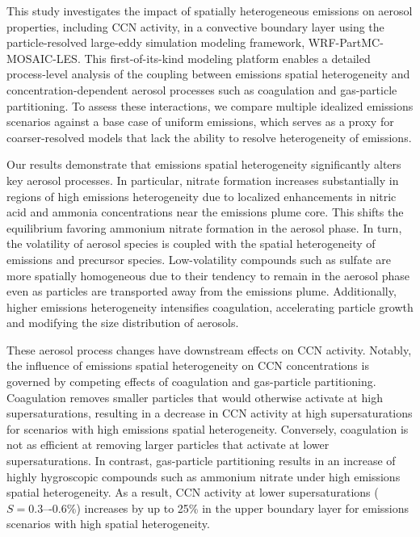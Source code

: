 \documentclass[journal abbreviation, manuscript]{copernicus}
\begin{document}
This study investigates the impact of spatially heterogeneous
emissions on aerosol properties, including CCN activity, in a
convective boundary layer using the particle-resolved large-eddy
simulation modeling framework, WRF-PartMC-MOSAIC-LES. This
first-of-its-kind modeling platform enables a detailed process-level
analysis of the coupling between emissions spatial heterogeneity and
concentration-dependent aerosol processes such as coagulation and
gas-particle partitioning. To assess these interactions, we compare
multiple idealized emissions scenarios against a base case of uniform
emissions, which serves as a proxy for coarser-resolved models that
lack the ability to resolve heterogeneity of emissions.

Our results demonstrate that emissions spatial heterogeneity
significantly alters key aerosol processes. In particular, nitrate
formation increases substantially in regions of high emissions
heterogeneity due to localized enhancements in nitric acid and ammonia
concentrations near the emissions plume core. This shifts the
equilibrium favoring ammonium nitrate formation in the aerosol
phase. In turn, the volatility of aerosol species is coupled with the
spatial heterogeneity of emissions and precursor species.
Low-volatility compounds such as sulfate are more spatially
homogeneous due to their tendency to remain in the aerosol phase even
as particles are transported away from the emissions plume.
Additionally, higher emissions heterogeneity intensifies coagulation,
accelerating particle growth and modifying the size distribution of
aerosols.

These aerosol process changes have downstream effects on CCN
activity. Notably, the influence of emissions spatial heterogeneity on
CCN concentrations is governed by competing effects of coagulation and
gas-particle partitioning. Coagulation removes smaller particles that
would otherwise activate at high supersaturations, resulting in a
decrease in CCN activity at high supersaturations for scenarios with
high emissions spatial heterogeneity. Conversely, coagulation is not
as efficient at removing larger particles that activate at lower
supersaturations. In contrast, gas-particle partitioning results in an
increase of highly hygroscopic compounds such as ammonium nitrate
under high emissions spatial heterogeneity. As a result, CCN activity
at lower supersaturations ($S = 0.3\mbox{–-}0.6\%$) increases by up to
25\% in the upper boundary layer for emissions scenarios with high
spatial heterogeneity.
\end{document}
